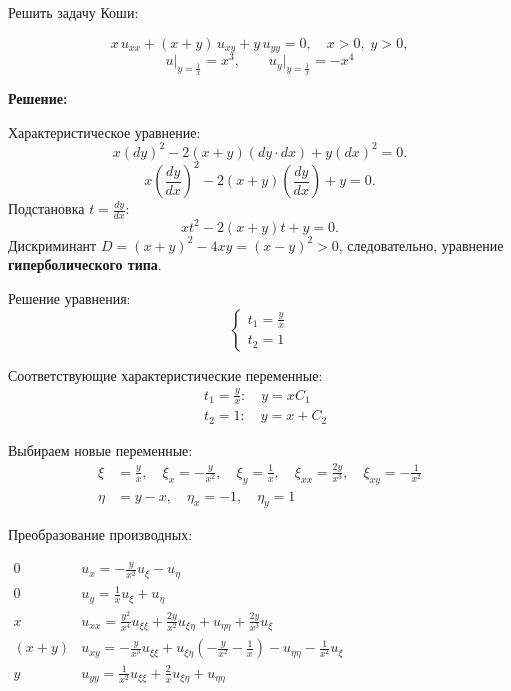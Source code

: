 \documentclass[a4paper,12pt]{article}
\begin{document}
Решить задачу Коши:

\begin{equation*}\label{eq:orig}
    x\,u_{xx} + (x+y)\,u_{xy} + y\,u_{yy}=0,\quad x>0,\;y>0,
\end{equation*}
\[
u \Big|_{y=\frac{1}{x}} = x^3, \quad \quad  u_{y} \Big|_{y=\frac{1}{x}} = -x^4
\]

\textbf{Решение:}

Характеристическое уравнение:
\[
x\left({dy}\right)^2 - 2(x+y)\left({dy}\cdot{dx}\right) + y\left({dx}\right)^2=0.
\]
\[
x\left(\frac{dy}{dx}\right)^2 - 2(x+y)\left(\frac{dy}{dx}\right) + y=0.
\]
Подстановка $t = \frac{dy}{dx}$:
\[
xt^2 - 2(x+y)t + y=0.
\]
Дискриминант $D = (x+y)^2 - 4xy = (x-y)^2> 0$, следовательно, уравнение \textbf{гиперболического типа}.

Решение уравнения:
\begin{equation*}
    \begin{cases}
    t_1 = \frac{y}{x} \\
    t_2 = 1
    \end{cases}
\end{equation*}

Соответствующие характеристические переменные:
\begin{align*}
    &t_1 = \frac{y}{x}: \quad y = xC_1 \\
    &t_2 = 1: \quad y = x + C_2
\end{align*}

Выбираем новые переменные:
\begin{align*}
    \xi &= \frac{y}{x} , \quad \xi_x = -\frac{y}{x^2},  \quad \xi_y = \frac{1}{x},   \quad  \xi_{xx} = \frac{2y}{x^3},  \quad  \xi_{xy} = -\frac{1}{x^2} \\
    \eta &= y - x, \quad \eta_x = -1,  \quad \eta_y = 1
\end{align*}

Преобразование производных:
\begin{flushleft}
\(
\begin{array}{r|l}
0 & u_x = -\frac{y}{x^2} u_{\xi} - u_{\eta} \\
0 & u_y =\frac{1}{x} u_{\xi} + u_{\eta} \\
x & u_{xx} = \frac{y^2}{x^4} u_{\xi\xi} + \frac{2y}{x^2} u_{\xi\eta}  + u_{\eta\eta} + \frac{2y}{x^3} u_{\xi} \\
(x+y) & u_{xy} = -\frac{y}{x^3} u_{\xi\xi} + u_{\xi\eta} (-\frac{y}{x^2} - \frac{1}{x}) - u_{\eta\eta} - \frac{1}{x^2} u_{\xi} \\
y & u_{yy} = \frac{1}{x^2} u_{\xi\xi} + \frac{2}{x} u_{\xi\eta}  + u_{\eta\eta} 
\end{array}
\)
\end{flushleft}
\end{document}
